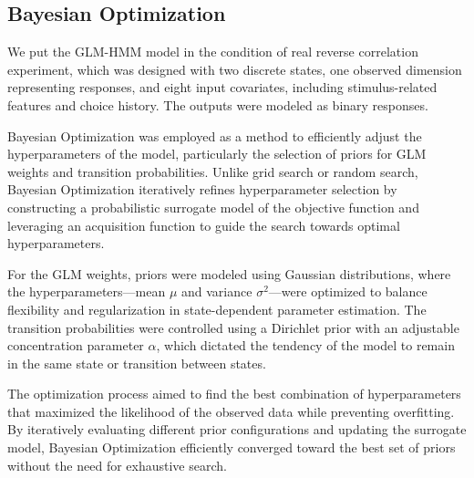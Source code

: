 \subsection{Bayesian Optimization}
We put the GLM-HMM model in the condition of real reverse correlation experiment, which was designed with two discrete states, one observed dimension representing responses, and eight input covariates, including stimulus-related features and choice history. The outputs were modeled as binary responses. 

Bayesian Optimization was employed as a method to efficiently adjust the hyperparameters of the model, particularly the selection of priors for GLM weights and transition probabilities. Unlike grid search or random search, Bayesian Optimization iteratively refines hyperparameter selection by constructing a probabilistic surrogate model of the objective function and leveraging an acquisition function to guide the search towards optimal hyperparameters.

For the GLM weights, priors were modeled using Gaussian distributions, where the hyperparameters—mean $\mu$ and variance $\sigma^2$—were optimized to balance flexibility and regularization in state-dependent parameter estimation. The transition probabilities were controlled using a Dirichlet prior with an adjustable concentration parameter $\alpha$, which dictated the tendency of the model to remain in the same state or transition between states.

The optimization process aimed to find the best combination of hyperparameters that maximized the likelihood of the observed data while preventing overfitting. By iteratively evaluating different prior configurations and updating the surrogate model, Bayesian Optimization efficiently converged toward the best set of priors without the need for exhaustive search.
